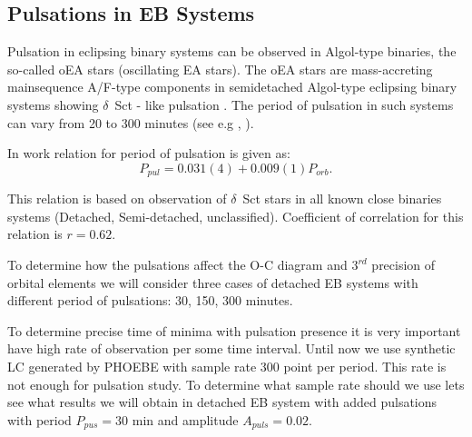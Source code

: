 \subsection{Pulsations in EB Systems}
Pulsation in eclipsing binary systems can be observed in Algol-type binaries, the so-called oEA stars (oscillating EA stars).
The oEA stars are mass-accreting mainsequence A/F-type components in semidetached Algol-type eclipsing binary systems showing $\delta$~Sct - like pulsation \citep{Rodriguez2010}. The period of pulsation in such systems can vary from 20 to 300 minutes (see e.g \cite{Liakos2017}, \cite{Mkrtichian2007}). 

In work \cite{Liakos2017} relation for period of pulsation is given as:
\begin{equation}
P_{pul} = 0.031(4) + 0.009(1) P_{orb}. 
\end{equation} 

This relation is based on observation of $\delta$~Sct stars in all known close binaries systems (Detached, Semi-detached, unclassified). Coefficient of correlation for this relation is $r = 0.62$.

To determine how the pulsations affect the O-C diagram and $3^{rd}$ precision of orbital elements we will consider three cases of detached EB systems with different period of pulsations: 30, 150, 300 minutes.

To determine precise time of minima with pulsation presence it is very important have high rate of observation per some time interval.
Until now we use synthetic LC generated by PHOEBE with sample rate 300 point per period. This rate is not enough for pulsation study.
To determine what sample rate should we use lets see what results we will obtain in detached EB system with added pulsations with period $P_{pus}=30$ min and amplitude $A_{puls} = 0.02$.           
